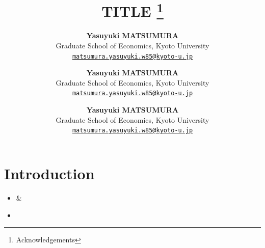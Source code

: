 \documentclass[12pt]{article}
\title{ %
  \textbf{TITLE} 
  \thanks{Acknowledgements}
}
\author{
  \textbf{Yasuyuki MATSUMURA}\\
  Graduate School of Economics, Kyoto University\\
  \href{mailto:matsumura.yasuyuki.w85@kyoto-u.jp}{\texttt{matsumura.yasuyuki.w85@kyoto-u.jp}}
\and
  \textbf{Yasuyuki MATSUMURA}\\
  Graduate School of Economics, Kyoto University\\
  \href{mailto:matsumura.yasuyuki.w85@kyoto-u.jp}{\texttt{matsumura.yasuyuki.w85@kyoto-u.jp}}
\and
  \textbf{Yasuyuki MATSUMURA}\\
  Graduate School of Economics, Kyoto University\\
  \href{mailto:matsumura.yasuyuki.w85@kyoto-u.jp}{\texttt{matsumura.yasuyuki.w85@kyoto-u.jp}}
}
\begin{document}
\maketitle

\begin{abstract}

\end{abstract}

\section{Introduction}

\begin{itemize}
  \item \cite{Ahn-Kasahara-2026} \& \cite{Shin-2025}
  \item \citep{Akgun-Okui-2025}
\end{itemize}


\newpage
{}
 

\end{document}
